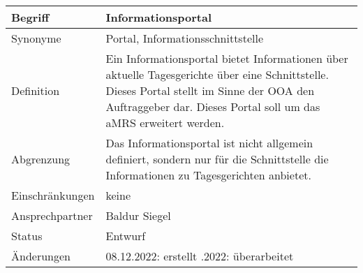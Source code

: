 \begin{table}[H]
    \centering
    \label{gls:informationsportal}
    \begin{tabularx}{\textwidth}{| l | X |}
        \hline
        Begriff         & Informationsportal                                                                                                                                                                                                 \\
        \hline
        Synonyme        & Portal, Informationsschnittstelle                                                                                                                                                                                  \\
        \hline
        Definition      & Ein Informationsportal bietet Informationen über aktuelle Tagesgerichte über eine Schnittstelle. Dieses Portal stellt im Sinne der OOA den Auftraggeber dar. Dieses Portal soll um das \ac{aMRS} erweitert werden. \\
        \hline
        Abgrenzung      & Das Informationsportal ist nicht allgemein definiert, sondern nur für die Schnittstelle die Informationen zu Tagesgerichten anbietet.                                                                              \\
        \hline
        Einschränkungen & keine                                                                                                                                                                                                              \\
        \hline
        Ansprechpartner & Baldur Siegel                                                                                                                                                                                                      \\
        \hline
        Status          & Entwurf                                                                                                                                                                                                            \\
        \hline
        Änderungen      & 08.12.2022: erstellt
        \newline 16.12.2022: überarbeitet                                                                                                                                                                                                    \\
        \hline
    \end{tabularx}
\end{table}



